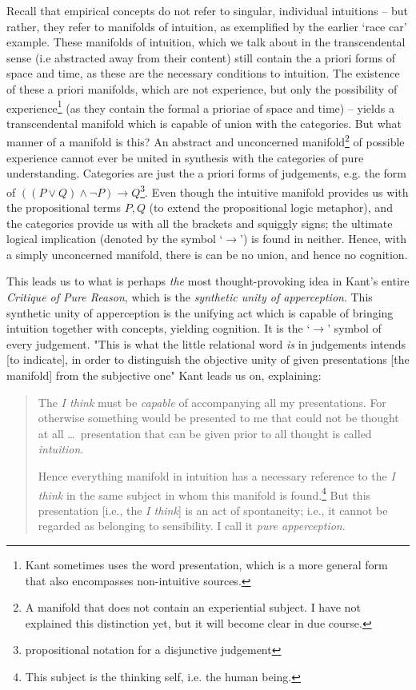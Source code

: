 \noindent
Recall that empirical concepts do not refer to singular, individual intuitions -- but rather, they refer to manifolds of intuition, as exemplified by the earlier `race car' example. These manifolds of intuition, which we talk about in the transcendental sense (i.e abstracted away from their content) still contain the a priori forms of space and time, as these are the necessary conditions to intuition. The existence of these a priori manifolds, which are not experience, but only the possibility of experience\footnote{Kant sometimes uses the word presentation, which is a more general form that also encompasses non-intuitive sources.} (as they contain the formal a prioriae of space and time) -- yields a transcendental manifold which is capable of union with the categories. But what manner of a manifold is this? An abstract and unconcerned manifold\footnote{A manifold that does not contain an experiential subject. I have not explained this distinction yet, but it will become clear in due course.} of possible experience cannot ever be united in synthesis with the categories of pure understanding. Categories are just the a priori forms of judgements, e.g. the form of $((P \lor Q) \land \neg P) \to Q$\footnote{propositional notation for a disjunctive judgement}. Even though the intuitive manifold provides us with the propositional terms $P, Q$ (to extend the propositional logic metaphor), and the categories provide us with all the brackets and squiggly signs; the ultimate logical implication (denoted by the symbol `$\to$') is found in neither. Hence, with a simply unconcerned manifold, there is can be no union, and hence no cognition.

This leads us to what is perhaps \emph{the} most thought-provoking idea in Kant's entire \emph{Critique of Pure Reason}, which is the \emph{synthetic unity of apperception}. This synthetic unity of apperception is the unifying act which is capable of bringing intuition together with concepts, yielding cognition. It is the `$\to$' symbol of every judgement. "This is what the little relational word \emph{is} in judgements intends [to indicate], in order to distinguish the objective unity of given presentations [the manifold] from the subjective one" \autocite[B142]{hackett} Kant leads us on, explaining:

\begin{quote}
  The \emph{I think} must be \emph{capable} of accompanying all my presentations. For otherwise something would be presented to me that could not be thought at all \ldots\ presentation that can be given prior to all thought is called \emph{intuition}.

  Hence everything manifold in intuition has a necessary reference to the \emph{I think} in the same subject in whom this manifold is found.\footnote{This subject is the thinking self, i.e. the human being.} But this presentation [i.e., the \emph{I think}] is an act of spontaneity; i.e., it cannot be regarded as belonging to sensibility. I call it \emph{pure apperception}.

  \autocite[B132]{hackett}
\end{quote}

